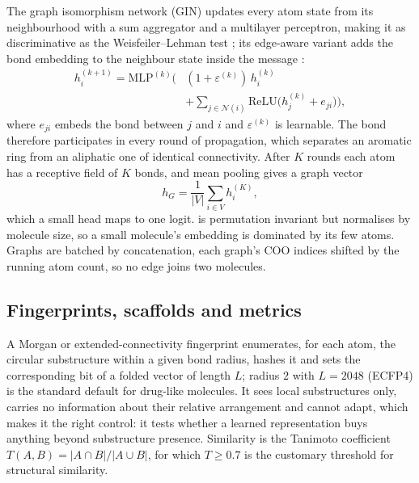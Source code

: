 The graph isomorphism network (GIN) updates every atom state from its neighbourhood \parencite{MPNN} with a sum aggregator and a multilayer perceptron, making it as discriminative as the Weisfeiler--Lehman test \parencite{GIN}; its edge-aware variant adds the bond embedding to the neighbour state inside the message \parencite{GINE}:
\begin{equation}
    \begin{split}
        h_i^{(k+1)} = \mathrm{MLP}^{(k)}\Big( &(1+\varepsilon^{(k)})\, h_i^{(k)} \\
        &+ \sum_{j \in \mathcal{N}(i)} \mathrm{ReLU}\big(h_j^{(k)} + e_{ji}\big) \Big),
    \end{split}
    \label{eq:gine}
\end{equation}
where $e_{ji}$ embeds the bond between $j$ and $i$ and $\varepsilon^{(k)}$ is learnable. The bond therefore participates in every round of propagation, which separates an aromatic ring from an aliphatic one of identical connectivity. After $K$ rounds each atom has a receptive field of $K$ bonds, and mean pooling gives a graph vector
\begin{equation}
    h_G = \frac{1}{|V|} \sum_{i \in V} h_i^{(K)},
    \label{eq:pool}
\end{equation}
which a small head maps to one logit.  is permutation invariant but normalises by molecule size, so a small molecule's embedding is dominated by its few atoms. Graphs are batched by concatenation, each graph's COO indices shifted by the running atom count, so no edge joins two molecules.

\subsection{Fingerprints, scaffolds and metrics}

A Morgan or extended-connectivity fingerprint \parencite{ECFP} enumerates, for each atom, the circular substructure within a given bond radius, hashes it and sets the corresponding bit of a folded vector of length $L$; radius $2$ with $L = 2048$ (ECFP4) is the standard default for drug-like molecules. It sees local substructures only, carries no information about their relative arrangement and cannot adapt, which makes it the right control: it tests whether a learned representation buys anything beyond substructure presence. Similarity is the Tanimoto coefficient $T(A,B) = |A \cap B| / |A \cup B|$, for which $T \geq 0.7$ is the customary threshold for structural similarity.


